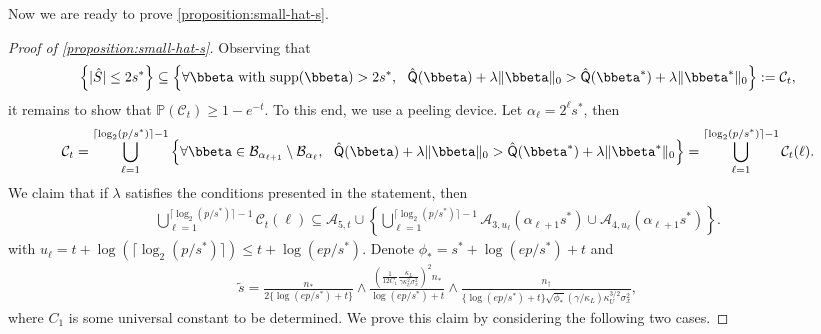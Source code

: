 \documentclass[10pt]{article}
\numberwithin{equation}{section}
\newcommand*{\supp}{\mathrm{supp}}
\begin{document}
Now we are ready to prove \cref{proposition:small-hat-s}.
\begin{proof}[Proof of \cref{proposition:small-hat-s}]
Observing that \begin{align*}
    \left\{|\hat{S}| \le 2s^*\right\} \subseteq \left\{ \forall \bbeta~\text{with}~\supp(\bbeta) > 2s^*,~~ \hat{\mathsf{Q}}(\bbeta) + \lambda \|\bbeta\|_0 > \hat{\mathsf{Q}}(\bbeta^*) + \lambda \|\bbeta^*\|_0 \right\} := \mathcal{C}_t,
\end{align*} it remains to show that $\mathbb{P}(\mathcal{C}_t) \ge 1-e^{-t}$. To this end, we use a peeling device. Let $\alpha_\ell=2^{\ell} s^*$, then 
\begin{align*}
    \mathcal{C}_t = \bigcup_{\ell=1}^{\lceil \log_2(p/s^*) \rceil - 1} \left\{\forall \bbeta \in \mathcal{B}_{\alpha_{\ell+1}} \setminus \mathcal{B}_{\alpha_{\ell}}, ~~ \hat{\mathsf{Q}}(\bbeta) + \lambda \|\bbeta\|_0 > \hat{\mathsf{Q}}(\bbeta^*) + \lambda \|\bbeta^*\|_0\right\} = \bigcup_{\ell=1}^{\lceil \log_2(p/s^*) \rceil - 1} \mathcal{C}_{t}(\ell).
\end{align*}
We claim that if $\lambda$ satisfies the conditions presented in the statement, then \begin{align}
\label{eq:proof-small-hats-peeling-argument}
    \bigcup_{\ell=1}^{\lceil \log_2(p/s^*) \rceil - 1} \mathcal{C}_{t}(\ell) \subseteq \mathcal{A}_{5,t} \cup \left\{\bigcup_{\ell=1}^{\lceil \log_2(p/s^*) \rceil - 1} \mathcal{A}_{3,u_{\ell}}(\alpha_{\ell+1} s^*) \cup \mathcal{A}_{4,u_{\ell}}(\alpha_{\ell+1} s^*)\right\}.
\end{align} with $u_\ell = t + \log (\lceil \log_2(p/s^*) \rceil) \le t + \log (ep/s^*)$.
Denote $\phi_* = s^* + \log(ep/s^*)+t$ and
\begin{align*}
    \tilde{s} = \frac{n_*}{2\{\log(ep/s^*) + t\}} \land \frac{\left(\frac{1}{12C_1} \frac{\kappa_L}{\gamma \kappa_U^2\sigma_x^2}\right)^2n_*}{\log(ep/s^*) + t} \land \frac{n_\dagger}{\{\log(ep/s^*)+t\} \sqrt{\phi_*} (\gamma/\kappa_L)\kappa_U^{3/2} \sigma_x^2 },
\end{align*} where $C_1$ is some universal constant to be determined. We prove this claim by considering the following two cases.


\end{proof}
\end{document}
